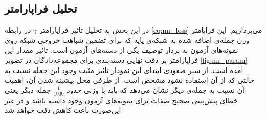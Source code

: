\subsection{تحلیل فراپارامتر}\label{exp:nn_params}
در این بخش به تحلیل تاثیر فراپارامتر $\gamma$ در رابطه \eqref{eq:nn_loss} می‌پردازیم. این فراپامتر وزن جمله‌ی اضافه شده به شبکه‌ی پایه که برای تضمین شباهت خروجی شبکه روی نمونه‌های آزمون به بردار توصیف یکی از دسته‌های آزمون است. تاثیر مقدار این فراپارامتر بر دقت نهایی دسته‌بندی برای مجموعه‌دادگان  در تصویر
\ref{fig:nn_param}
آمده است. از سیر صعودی ابتدای این نمودار تاثیر مثبت وجود این جمله نسبت به حالتی که از آن استفاده نشود مشخص است. از طرفی محل بیشینه شدن آن، اهمیت آن نسبت به جمله‌ی دیگر نشان می‌دهد که باید با وزنی حدود $\frac{1}{1000}$ جمله دیگر یعنی خطای پیش‌پینی صحیح صفات برای نمونه‌های آزمون وجود داشته باشد و در غیر این‌صورت باعث کاهش دقت خواهد شد.
